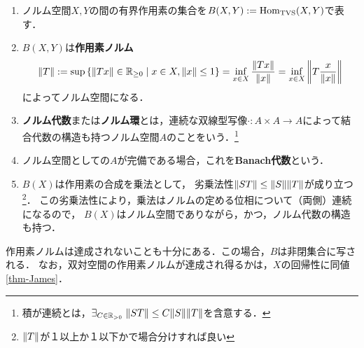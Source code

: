 \documentclass[uplatex,dvipdfmx]{jsreport}
\begin{document}
\begin{definition}\mbox{}
    \begin{enumerate}
        \item ノルム空間$X,Y$の間の有界作用素の集合を$B(X,Y):=\mathrm{Hom}_{\mathrm{TVS}}(X,Y)$で表す．
        \item $B(X,Y)$は\textbf{作用素ノルム}
        \[\|T\|:=\sup\left\{\|Tx\|\in\mathbb{R}_{\ge 0}\mid x\in X,\|x\|\le 1\right\}=\inf_{x\in X}\frac{\|Tx\|}{\|x\|}=\inf_{x\in X}\left\|T\frac{x}{\|x\|}\right\|\]によってノルム空間になる．
        \item \textbf{ノルム代数}または\textbf{ノルム環}とは，連続な双線型写像$\cdot :A\times A\to A$によって結合代数の構造も持つノルム空間$A$のことをいう．\footnote{積が連続とは，$\exists_{C\in\mathbb{R}_{>0}}\;\|ST\|\le C\|S\|\|T\|$を含意する．}
        \item ノルム空間としての$A$が完備である場合，これを\textbf{Banach代数}という．
        \item $B(X)$は作用素の合成を乗法として，
        劣乗法性$\|ST\|\le\|S\|\|T\|$が成り立つ\footnote{$\|T\|$が１以上か１以下かで場合分けすれば良い}．
        この劣乗法性により，乗法はノルムの定める位相について（両側）連続になるので，
        $B(X)$はノルム空間でありながら，かつ，ノルム代数の構造も持つ．
    \end{enumerate}
\end{definition}
\begin{remarks}
    作用素ノルムは達成されないことも十分にある．この場合，$B$は非閉集合に写される．
    なお，双対空間の作用素ノルムが達成され得るかは，$X$の回帰性に同値\ref{thm-James}．
\end{remarks}
\end{document}
